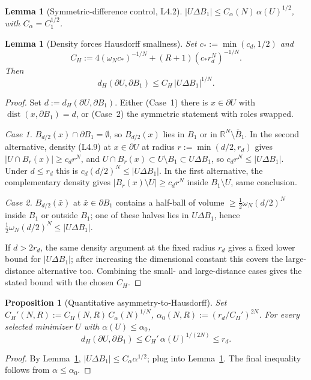 \documentclass[11pt]{article}
\newtheorem{proposition}[theorem]{Proposition}
\newtheorem{lemma}[theorem]{Lemma}
\theoremstyle{definition}
\theoremstyle{remark}
\newcommand{\BB}{B_1}
\newcommand{\dH}{d_H}
\newcommand{\R}{\mathbb{R}}
\begin{document}
\begin{lemma}[Symmetric-difference control, \cite{BDV} L4.2]\label{lem:symdiff}
$|U\Delta\BB|\le C_\alpha(N)\,\alpha(U)^{1/2}$, with $C_\alpha=C_1^{1/2}$.
\end{lemma}

\begin{lemma}[Density forces Hausdorff smallness]\label{lem:densH}
Set $c_*:=\min(c_d,1/2)$ and
\[
   C_H:=4(\omega_N c_*)^{-1/N}
      + (R+1)(c_*r_d^N)^{-1/N}.
\]
Then
\[
\dH(\partial U,\partial\BB)\le C_H\,|U\Delta\BB|^{1/N}.
\]
\end{lemma}

\begin{proof}
Set $d:=\dH(\partial U,\partial\BB)$. Either (Case~1) there is
$x\in\partial U$ with $\operatorname{dist}(x,\partial\BB)=d$, or (Case~2)
the symmetric statement with roles swapped.

\emph{Case 1.} $B_{d/2}(x)\cap\partial\BB=\emptyset$, so $B_{d/2}(x)$ lies
in $\BB$ or in $\R^N\setminus\overline\BB$. In the second alternative,
density (L4.9) at $x\in\partial U$ at radius $r:=\min(d/2,r_d)$ gives
$|U\cap B_r(x)|\ge c_d r^N$, and $U\cap B_r(x)\subset U\setminus\BB\subset
U\Delta\BB$, so $c_d r^N\le|U\Delta\BB|$. Under $d\le r_d$ this is
$c_d(d/2)^N\le|U\Delta\BB|$. In the first alternative, the complementary
density gives $|B_r(x)\setminus U|\ge c_d r^N$ inside $\BB\setminus U$, same
conclusion.

\emph{Case 2.} $B_{d/2}(\bar x)$ at $\bar x\in\partial\BB$ contains a
half-ball of volume $\ge\tfrac12\omega_N(d/2)^N$ inside $\BB$ or outside
$\BB$; one of these halves lies in $U\Delta\BB$, hence
$\tfrac12\omega_N(d/2)^N\le|U\Delta\BB|$.

If $d>2r_d$, the same density argument at the fixed radius $r_d$ gives a
fixed lower bound for $|U\Delta\BB|$; after increasing the dimensional
constant this covers the large-distance alternative too. Combining the
small- and large-distance cases gives the stated bound with the chosen
$C_H$.
\end{proof}

\begin{proposition}[Quantitative asymmetry-to-Hausdorff]\label{prop:alphaH}
Set $C_H'(N,R):=C_H(N,R)\,C_\alpha(N)^{1/N}$,
$\alpha_0(N,R):=(r_d/C_H')^{2N}$. For every selected minimizer $U$ with
$\alpha(U)\le\alpha_0$,
\[
\dH(\partial U,\partial\BB)\le C_H'\,\alpha(U)^{1/(2N)}\le r_d.
\]
\end{proposition}

\begin{proof}
By Lemma~\ref{lem:symdiff}, $|U\Delta\BB|\le C_\alpha\alpha^{1/2}$; plug
into Lemma~\ref{lem:densH}. The final inequality follows from
$\alpha\le\alpha_0$.
\end{proof}
\end{document}
